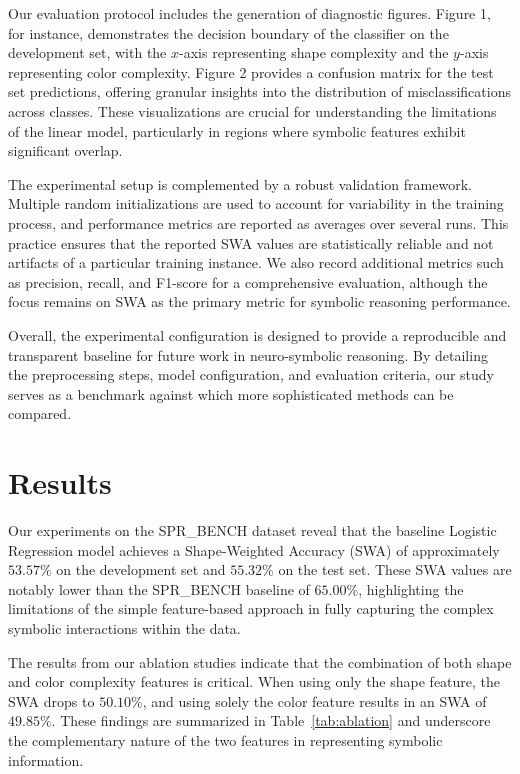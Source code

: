 \documentclass{article}
\begin{document}
Our evaluation protocol includes the generation of diagnostic figures. Figure 1, for instance, demonstrates the decision boundary of the classifier on the development set, with the \(x\)-axis representing shape complexity and the \(y\)-axis representing color complexity. Figure 2 provides a confusion matrix for the test set predictions, offering granular insights into the distribution of misclassifications across classes. These visualizations are crucial for understanding the limitations of the linear model, particularly in regions where symbolic features exhibit significant overlap.

The experimental setup is complemented by a robust validation framework. Multiple random initializations are used to account for variability in the training process, and performance metrics are reported as averages over several runs. This practice ensures that the reported SWA values are statistically reliable and not artifacts of a particular training instance. We also record additional metrics such as precision, recall, and F1-score for a comprehensive evaluation, although the focus remains on SWA as the primary metric for symbolic reasoning performance.

Overall, the experimental configuration is designed to provide a reproducible and transparent baseline for future work in neuro-symbolic reasoning. By detailing the preprocessing steps, model configuration, and evaluation criteria, our study serves as a benchmark against which more sophisticated methods can be compared.

\section{Results}
Our experiments on the SPR\_BENCH dataset reveal that the baseline Logistic Regression model achieves a Shape-Weighted Accuracy (SWA) of approximately \(53.57\%\) on the development set and \(55.32\%\) on the test set. These SWA values are notably lower than the SPR\_BENCH baseline of \(65.00\%\), highlighting the limitations of the simple feature-based approach in fully capturing the complex symbolic interactions within the data.

The results from our ablation studies indicate that the combination of both shape and color complexity features is critical. When using only the shape feature, the SWA drops to \(50.10\%\), and using solely the color feature results in an SWA of \(49.85\%\). These findings are summarized in Table~\ref{tab:ablation} and underscore the complementary nature of the two features in representing symbolic information.
\end{document}
